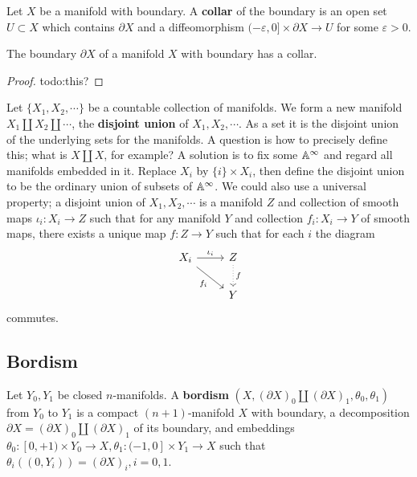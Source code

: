 \begin{definition}[]
    Let $X$ be a manifold with boundary. A \textbf{collar} of the boundary is an open set $U \subset X$ which contains $\partial X$ and a diffeomorphism $(-\varepsilon ,0] \times \partial X\to U$ for some $\varepsilon >0$.
\end{definition}
\begin{theorem}
    The boundary $\partial X$ of a manifold $X$ with boundary has a collar.
\end{theorem}
\begin{proof}
    {\color{red}todo:this?} 
\end{proof}

Let $\{X_1,X_2,\cdots \} $ be a countable collection of manifolds. We form a new manifold $X_1 \amalg X_2 \amalg \cdots $, the \textbf{disjoint union} of $X_1,X_2,\cdots $. As a set it is the disjoint union of the underlying sets for the manifolds. A question is how to precisely define this; what is $X\amalg X$, for example? A solution is to fix some $\mathbb{A}^{\infty}$ and regard all manifolds embedded in it. Replace $X_i $ by $\{i\} \times X_i $, then define the disjoint union to be the ordinary union of subsets of $\mathbb{A}^{\infty}$. We could also use a universal property; a disjoint union of $X_1,X_2,\cdots $ is a manifold $Z$ and collection of smooth maps $\iota_i  \colon X_i  \to Z$ such that for any manifold $Y$ and collection $f_i  \colon X_i  \to Y$ of smooth maps, there exists a unique map $f \colon Z \to Y$ such that for each $i$ the diagram \[
\begin{tikzcd}
    X_i  \arrow[r, "\iota _i" ] \arrow[rd, "f_i "']& Z\arrow[d, dotted, "f"]\\
     & Y
\end{tikzcd}
\] commutes. 
\subsection{Bordism}
\begin{definition}[]
    
Let $Y_0,Y_1$ be closed $n$-manifolds. A \textbf{bordism} $(X,(\partial X)_0 \amalg (\partial X)_1, \theta_0,\theta_1)$ from $Y_0$ to $Y_1$ is a compact $(n+1)$-manifold $X$ with boundary, a decomposition $\partial X=(\partial X)_0\amalg (\partial X)_1$ of its boundary, and embeddings $\theta_0 \colon [0,+1) \times Y_0 \to X, \theta_1 \colon (-1,0] \times Y_1 \to X$ such that $\theta_i ((0,Y_i) )=(\partial X)_i ,i=0,1$. 
\end{definition}

